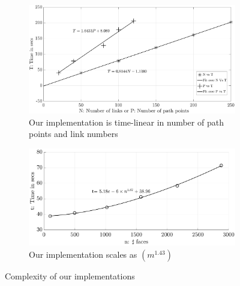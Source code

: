 \documentclass[12pt,a4]{article}
\begin{document}
\begin{figure}
\centering
\begin{subfigure}{0.48\textwidth}
\centering
 \includegraphics[width=\linewidth]{figures/Path_and_link_complexity.pdf}
\caption{Our implementation is time-linear in number of path points and link numbers}
\label{fig:path_complexity}
\end{subfigure}%
\begin{subfigure}{0.48\textwidth}
\centering
 \includegraphics[width=1.1\linewidth]{figures/face_complexity.pdf}
\caption{Our implementation scales as $(m^{1.43})$ }
\label{fig:face_complexity}
\end{subfigure}%
\caption{ Complexity of our implementations}
\label{fig:complexity}
\end{figure}
 
\end{document}
